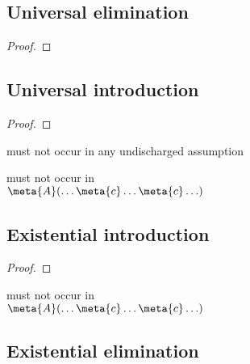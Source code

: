 \begin{multicols}{2}
\subsection*{Universal elimination}

\begin{proof}
	 
\end{proof}

\subsection*{Universal introduction}

\begin{proof}
	 
\end{proof}

\medskip\begin{raggedright}
 must not occur in any undischarged assumption

 must not occur in\\ $\meta{A}(\ldots \meta{c} \ldots \meta{c}\ldots)$
\end{raggedright}

\subsection*{Existential introduction}

\begin{proof}
\end{proof}

\medskip\begin{raggedright}
\noindent {} must not occur in\\ $\meta{A}(\ldots \meta{c} \ldots \meta{c}\ldots)$
\end{raggedright}

\subsection*{Existential elimination}


\end{multicols}

